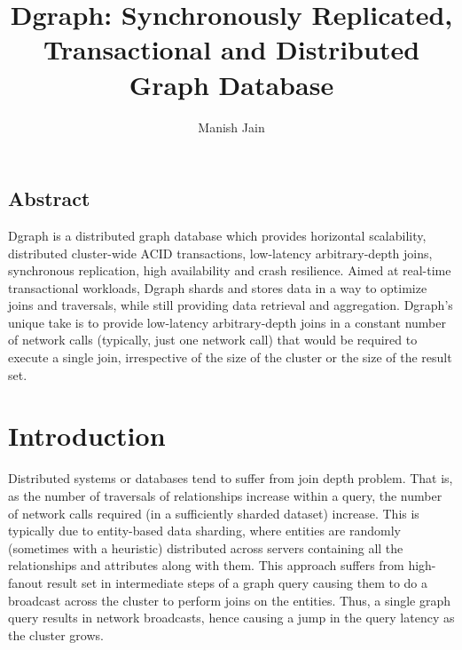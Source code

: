 \documentclass[letterpaper,twocolumn,10pt]{article}
\begin{document}
\date{}

\title{\Large \bf Dgraph: Synchronously Replicated, Transactional and Distributed Graph Database}

\author{Manish Jain}

\maketitle


\subsection*{Abstract}

Dgraph is a distributed graph database which provides horizontal scalability,
distributed cluster-wide ACID transactions, low-latency arbitrary-depth joins,
synchronous replication, high availability and crash resilience.  Aimed at
real-time transactional workloads, Dgraph shards and stores data in a way to
optimize joins and traversals, while still providing data retrieval and
aggregation. Dgraph's unique take is to provide low-latency arbitrary-depth
joins in a constant number of network calls (typically, just one network call)
that would be required to execute a single join, irrespective of the size of the
cluster or the size of the result set.

\section{Introduction}

Distributed systems or databases tend to suffer from join depth problem. That
is, as the number of traversals of relationships increase within a query, the
number of network calls required (in a sufficiently sharded dataset) increase.
This is typically due to entity-based data sharding, where entities are randomly
(sometimes with a heuristic) distributed across servers containing all the
relationships and attributes along with them. This approach suffers from
high-fanout result set in intermediate steps of a graph query causing them to do
a broadcast across the cluster to perform joins on the entities. Thus, a single
graph query results in network broadcasts, hence causing a jump in the query
latency as the cluster grows.
\end{document}
